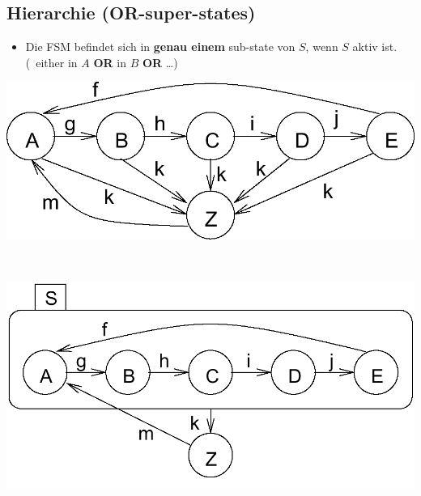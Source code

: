 \subsection{Hierarchie (OR-super-states)}

\begin{itemize}
    \item Die FSM befindet sich in \textbf{genau einem} sub-state von $S$, wenn $S$ aktiv ist.\\
        (\textrightarrow\ either in $A$ \textbf{OR} in $B$ \textbf{OR} \ldots)
\end{itemize}

\vspace{0.2cm}

\begin{minipage}[c]{0.41\columnwidth}
    \includegraphics[width=\columnwidth]{images/statechart_unuebersichtlich.png}
\end{minipage}
\hfill
\begin{minipage}[c]{0.05\columnwidth}
    \begin{center}
        \huge \textrightarrow\
    \end{center}
\end{minipage}
\hfill
\begin{minipage}[c]{0.41\columnwidth}
    \includegraphics[width=\columnwidth]{images/statechart_hierarchie.png}
\end{minipage}


